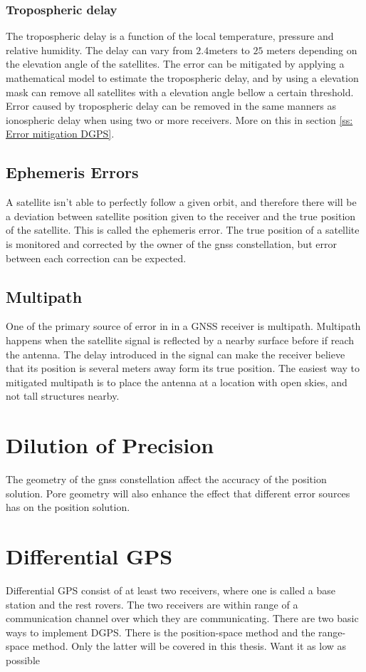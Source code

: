 \subsubsection{Tropospheric delay}
The tropospheric delay is a function of the local temperature, pressure and relative humidity. The delay can vary from $2.4$meters to $25$ meters depending on the elevation angle of the satellites. The error can be mitigated by applying a mathematical model to estimate the tropospheric delay, and by using a elevation mask can remove all satellites with a elevation angle bellow a certain threshold. Error caused by tropospheric delay can be removed in the same manners as ionospheric delay when using two or more receivers. More on this in section \ref{ss: Error mitigation DGPS}.

\subsection{Ephemeris Errors}
A satellite isn't able to perfectly follow a given orbit, and therefore there will be a deviation between satellite position given to the receiver and the true position of the satellite. This is called the ephemeris error. The true position of a satellite is monitored and corrected by the owner of the \gls{gnss} constellation, but error between each correction can be expected.
\subsection{Multipath}
One of the primary source of error in in a GNSS receiver is multipath. Multipath happens when the satellite signal is reflected by a nearby surface before if reach the antenna. The delay introduced in the signal can make the receiver believe that its position is several meters away form its true position. The easiest way to mitigated multipath is to place the antenna at a location with open skies, and not tall structures nearby.
\section{Dilution of Precision}
The geometry of the \gls{gnss} constellation affect the accuracy of the position solution. Pore geometry will also enhance the effect that different error sources has on the position solution.
\section{Differential GPS}
Differential GPS consist of at least two receivers, where one is called a base station and the rest rovers. The two receivers are within range of a communication channel over which they are communicating. There are two basic ways to implement DGPS. There is the position-space method and the range-space method. Only the latter will be covered in this thesis. Want it as low as possible
